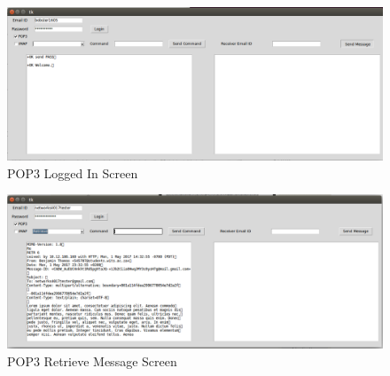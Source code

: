 \documentclass[11pt]{article}
\begin{document}
\begin{figure}[h]
\centering
\caption{POP3 Logged In Screen}
\includegraphics[scale=0.7]{POP3loggedIN.png}
\end{figure}

\begin{figure}[h]
\centering
\caption{POP3 Retrieve Message Screen}
\includegraphics[scale=0.45]{receivedEmail.png}
\end{figure}
\end{document}
